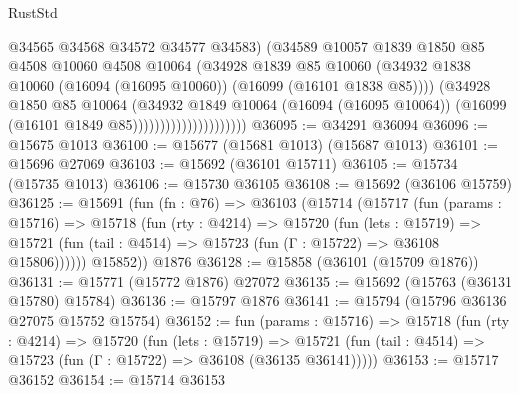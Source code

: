 \begin{lexlean}{RustStd}
\begin{coremodule}
                                      @34565
                                      @34568
                                      @34572
                                      @34577
                                      @34583)
                                    (@34589
                                      @10057
                                      @1839
                                      @1850
                                      @85
                                      @4508
                                      @10060
                                      @4508
                                      @10064
                                      (@34928
                                        @1839
                                        @85
                                        @10060
                                        (@34932
                                          @1838
                                          @10060
                                          (@16094 (@16095 @10060))
                                          (@16099 (@16101 @1838 @85))))
                                      (@34928
                                        @1850
                                        @85
                                        @10064
                                        (@34932
                                          @1849
                                          @10064
                                          (@16094 (@16095 @10064))
                                          (@16099 (@16101 @1849 @85)))))))))))))))))))))
@36095 := @34291 @36094
@36096 := @15675 @1013
@36100 := @15677 (@15681 @1013) (@15687 @1013)
@36101 := @15696 @27069
@36103 := @15692 (@36101 @15711)
@36105 := @15734 (@15735 @1013)
@36106 := @15730 @36105
@36108 := @15692 (@36106 @15759)
@36125 := @15691
    (fun (fn : @76) =>
    @36103
      (@15714
        (@15717
          (fun (params : @15716) =>
          @15718
            (fun (rty : @4214) =>
            @15720
              (fun (lets : @15719) =>
              @15721 (fun (tail : @4514) => @15723 (fun (Γ : @15722) => @36108 @15806))))))
        @15852))
    @1876
@36128 := @15858 (@36101 (@15709 @1876))
@36131 := @15771 (@15772 @1876) @27072
@36135 := @15692 (@15763 (@36131 @15780) @15784)
@36136 := @15797 @1876
@36141 := @15794 (@15796 @36136 @27075 @15752 @15754)
@36152 := fun (params : @15716) =>
  @15718
    (fun (rty : @4214) =>
    @15720
      (fun (lets : @15719) =>
      @15721 (fun (tail : @4514) => @15723 (fun (Γ : @15722) => @36108 (@36135 @36141)))))
@36153 := @15717 @36152
@36154 := @15714 @36153

\end{coremodule}
\end{lexlean}
